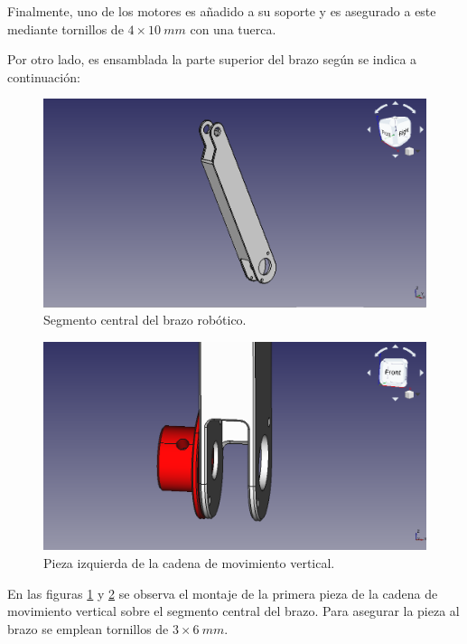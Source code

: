 Finalmente, uno de los motores es añadido a su soporte y es asegurado a este mediante tornillos de $4 \times 10~mm$ con una tuerca.

Por otro lado, es ensamblada la parte superior del brazo según se indica a continuación:

\begin{figure}[H]
    \centering 
    \includegraphics[width=1\linewidth]{pictures/SegmentoCentralBrazo.png}
    \caption{Segmento central del brazo robótico.}
    \label{fig:segmento_central_brazo}
\end{figure}

\begin{figure}[H]
    \centering 
    \includegraphics[width=1\linewidth]{pictures/SoporteMotorIzquierdo.png}
    \caption{Pieza izquierda de la cadena de movimiento vertical.}
    \label{fig:pieza_izquierda_brazo}
\end{figure}

En las figuras \ref{fig:segmento_central_brazo} y \ref{fig:pieza_izquierda_brazo} se observa el montaje de la primera pieza de la cadena de movimiento vertical sobre el segmento central del brazo. Para asegurar la pieza al brazo se emplean tornillos de $3 \times 6~mm$.

